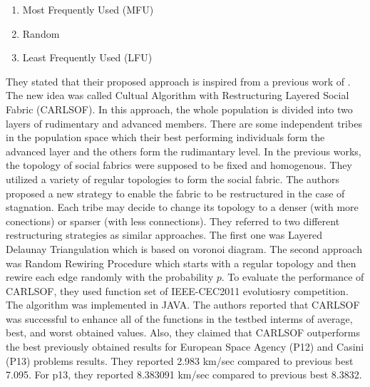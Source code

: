 \begin{enumerate}
	\item Most Frequently Used (MFU)
	\item Random
	\item Least Frequently Used (LFU)
\end{enumerate}
They stated that their proposed approach is inspired from a previous work of \cite{reynolds2008mining}. The new idea was called Cultual Algorithm with Restructuring Layered Social Fabric (CARLSOF). In this approach, the whole population is divided into two layers of rudimentary and advanced members. There are some independent tribes in the population space which their best performing individuals form the advanced layer and the others form the rudimantary level. In the previous works, the topology of social fabrics were supposed to be fixed and homogenous. They utilized a variety of regular topologies to form the social fabric. The authors proposed a new strategy to enable the fabric to be restructured in the case of stagnation. Each tribe may decide to change its topology to a denser (with more conections) or sparser (with less connections). They referred to two different restructuring strategies as similar approaches. The first one was Layered Delaunay Triangulation which is based on voronoi diagram. The second approach was Random Rewiring Procedure which starts with a regular topology and then rewire each edge randomly with the probability $p$. \newline
To evaluate the performance of CARLSOF, they used function set of IEEE-CEC2011 evolutiosry competition. The algorithm was implemented in JAVA. The authors reported that CARLSOF was successful to enhance all of the functions in the testbed interms of average, best, and worst obtained values. Also, they claimed that CARLSOF outperforms the best previously obtained results for European Space Agency (P12) and Casini (P13) problems results. They reported 2.983 km/sec compared to previous best 7.095. For p13, they reported 8.383091 km/sec compared to previous best 8.3832.
